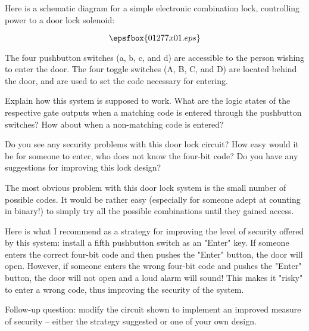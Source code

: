 

Here is a schematic diagram for a simple electronic combination lock, controlling power to a door lock solenoid:

$$\epsfbox{01277x01.eps}$$

The four pushbutton switches (a, b, c, and d) are accessible to the person wishing to enter the door.  The four toggle switches (A, B, C, and D) are located behind the door, and are used to set the code necessary for entering.

Explain how this system is supposed to work.  What are the logic states of the respective gate outputs when a matching code is entered through the pushbutton switches?  How about when a non-matching code is entered?

Do you see any security problems with this door lock circuit?  How easy would it be for someone to enter, who does not know the four-bit code?  Do you have any suggestions for improving this lock design?







The most obvious problem with this door lock system is the small number of possible codes.  It would be rather easy (especially for someone adept at counting in binary!) to simply try all the possible combinations until they gained access.

Here is what I recommend as a strategy for improving the level of security offered by this system: install a fifth pushbutton switch as an "Enter" key.  If someone enters the correct four-bit code and then pushes the "Enter" button, the door will open.  However, if someone enters the wrong four-bit code and pushes the "Enter" button, the door will not open and a loud alarm will sound!  This makes it "risky" to enter a wrong code, thus improving the security of the system.

\vskip 10pt

Follow-up question: modify the circuit shown to implement an improved measure of security -- either the strategy suggested or one of your own design.






